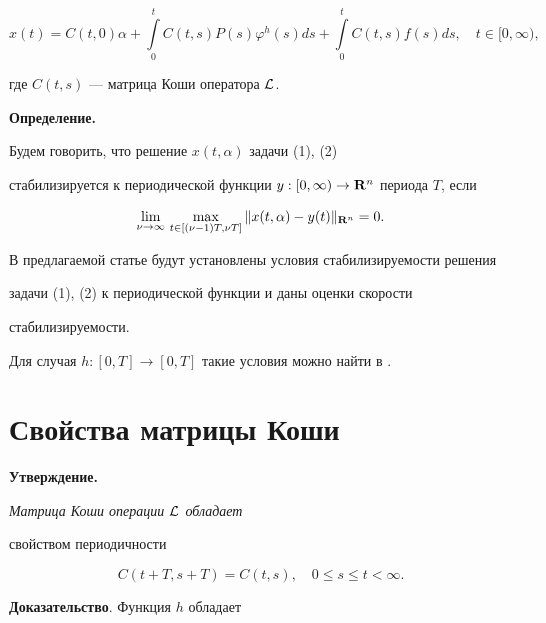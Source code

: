 $$


x(t)=C(t,0){\alpha}+\int\limits_0^tC(t,s)P(s){\varphi}^h(s)ds+


\int\limits_0^tC(t,s)f(s)ds,\quad t\in [0,{\infty }),


$$


где $C(t,s)$ --- матрица Коши оператора ${\cal L}$.


\medskip





{\bf Определение.}


Будем говорить, что решение $x(t,{\alpha})$ задачи (1), (2)


стабилизируется к периодической функции $y:[0,{\infty})\to {{\bold


R}^n}$ периода $T$, если


$$


\lim_{{\nu}\to \infty


}\,\max_{t\in [({\nu}-1)T,{\nu}T]}\| x(t,{\alpha})-y(t)


\|_{{\bold R}^n}=0.


$$





В предлагаемой статье будут установлены условия стабилизируемости решения


задачи (1), (2) к периодической функции и даны оценки скорости


стабилизируемости.


Для случая $h:[0,T]\to [0,T]$ такие условия можно найти в \cite{3}.





\section{Свойства матрицы Коши}





{\bf Утверждение.} {\it Матрица Коши операции ${\cal L}$ обладает


свойством периодичности}


$$


C(t+T,s+T)=C(t,s),\quad


0{\le}s{\le}t<{\infty}.


$$





{\bf Доказательство}. Функция $h$ обладает


